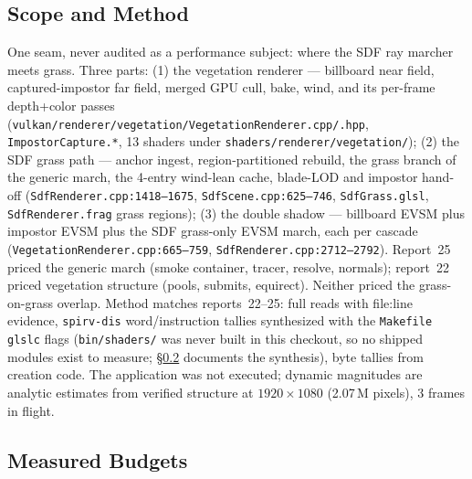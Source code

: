 \documentclass[11pt,a4paper]{article}
\begin{document}
\subsection{Scope and Method}

One seam, never audited as a performance subject: where the SDF ray marcher
meets grass. Three parts: (1) the vegetation renderer --- billboard
near field, captured-impostor far field, merged GPU cull, bake, wind, and
its per-frame depth+color passes (\texttt{vulkan/renderer/vegetation/VegetationRenderer.cpp/.hpp},
\texttt{ImpostorCapture.*}, 13 shaders under
\texttt{shaders/renderer/vegetation/}); (2) the SDF grass path --- anchor
ingest, region-partitioned rebuild, the grass branch of the generic march,
the 4-entry wind-lean cache, blade-LOD and impostor hand-off
(\texttt{SdfRenderer.cpp:1418--1675}, \texttt{SdfScene.cpp:625--746},
\texttt{SdfGrass.glsl}, \texttt{SdfRenderer.frag} grass regions); (3) the
double shadow --- billboard EVSM plus impostor EVSM plus the SDF grass-only
EVSM march, each per cascade (\texttt{VegetationRenderer.cpp:665--759},
\texttt{SdfRenderer.cpp:2712--2792}). Report~25 priced the generic march
(smoke container, tracer, resolve, normals); report~22 priced vegetation
structure (pools, submits, equirect). Neither priced the grass-on-grass
overlap. Method matches reports~22--25: full reads with file:line evidence,
\texttt{spirv-dis} word/instruction tallies synthesized with the
\texttt{Makefile} \texttt{glslc} flags (\texttt{bin/shaders/} was never built
in this checkout, so no shipped modules exist to measure; §\ref{sec:budgets}
documents the synthesis), byte tallies from creation code. The application
was not executed; dynamic magnitudes are analytic estimates from verified
structure at $1920\times1080$ (2.07\,M pixels), 3 frames in flight.

\subsection{Measured Budgets}
\label{sec:budgets}
\end{document}
